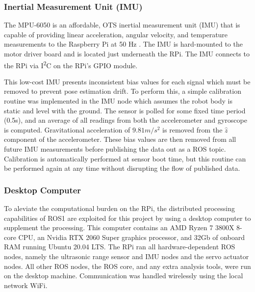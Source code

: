 \subsubsection{ Inertial Measurement Unit (IMU)}

The MPU-6050 is an affordable, OTS inertial measurement unit (IMU) that is capable of providing linear acceleration, angular velocity, and temperature measurements to the Raspberry Pi at 50 Hz \cite{mpu6050}.  The IMU is hard-mounted to the motor driver board and is located just underneath the RPi. The IMU connects to the RPi via I\textsuperscript{2}C on the RPi's GPIO module.

This low-cost IMU presents inconsistent bias values for each signal which must be removed to prevent pose estimation drift. To perform this, a simple calibration routine was implemented in the IMU node which assumes the robot body is static and level with the ground. The sensor is polled for some fixed time period (0.5s), and an average of all readings from both the accelerometer and gyroscope is computed. Gravitational acceleration of $9.81 m/s^2$ is removed from the $\hat{z}$ component of the accelerometer. These bias values are then removed from all future IMU measurements before publishing the data out as a ROS topic. Calibration is automatically performed at sensor boot time, but this routine can be performed again at any time without disrupting the flow of published data.

\subsubsection{ Desktop Computer }
To aleviate the computational burden on the RPi, the distributed processing capabilities of ROS1 are exploited for this project by using a desktop computer to supplement the processing. This computer contains an AMD Ryzen 7 3800X 8-core CPU, an Nvidia RTX 2060 Super graphics processor, and 32Gb of onboard RAM running Ubuntu 20.04 LTS. The RPi ran all hardware-dependent ROS nodes, namely the ultrasonic range sensor and IMU nodes and the servo actuator nodes. All other ROS nodes, the ROS core, and any extra analysis tools, were run on the desktop machine. Communication was handled wirelessly using the local network WiFi.